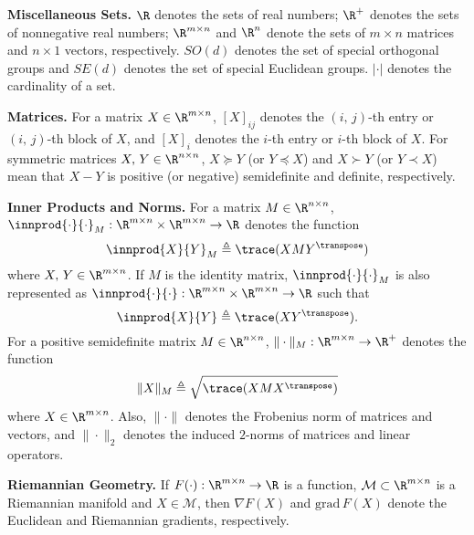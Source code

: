 

\textbf{Miscellaneous Sets.}\; $\R$ denotes the sets of real numbers; $\R^+$ denotes the sets of nonnegative real numbers; $\R^{m\times n}$ and $\R^n$ denote the sets of $m\times n$ matrices and $n\times 1$ vectors, respectively. $SO(d)$ denotes the set of special orthogonal groups and  $SE(d)$ denotes the set of special Euclidean groups.  $|\cdot|$ denotes the cardinality of a set.

\textbf{Matrices.}\; For a matrix $X\in \R^{m\times n}$, $[X]_{ij}$ denotes the $(i,\,j)$-th entry or $(i,\,j)$-th block of $X$, and $[X]_i$ denotes the $i$-th entry or $i$-th block of $X$. For symmetric matrices $X,\, Y\in \R^{n\times n}$, $X\succeq Y$ (or $Y\preceq X$) and $X\succ Y$ (or $Y\prec X$) mean that $X-Y$ is positive (or negative) semidefinite and definite, respectively.

\textbf{Inner Products and Norms.}\; For a matrix $M\in\R^{n\times n}$, $\innprod{\cdot}{\cdot}_{M}:\R^{m\times n}\times \R^{m\times n}\rightarrow \R$ denotes the function
\vspace{-0.25em}
\begin{equation}\label{eq::innerM}
	\innprod{X}{Y}_M\triangleq \trace(XMY^\transpose)
\end{equation}
where $X,\,Y\in \R^{m\times n}$. If $M$ is the identity matrix, $\innprod{\cdot}{\cdot}_M$ is also represented as $\innprod{\cdot}{\cdot}:\R^{m\times n}\times\R^{m\times n}\rightarrow \R$ such that
\vspace{-0.15em}
\begin{equation}\label{eq::inner}
\innprod{X}{Y}\triangleq\trace(XY^\transpose).
\vspace{-0.1em}
\end{equation}
For a positive semidefinite matrix $M\in\R^{n\times n}$, $\|\cdot\|_M:\R^{m\times n}\rightarrow\R^+$ denotes the function
\vspace{-0.15em}
\begin{equation}\label{eq::normM}
\|X\|_M\triangleq\sqrt{\trace(X M X^\transpose)}
\vspace{-0.1em}
\end{equation}
where $X\in \R^{m\times n}$.  Also, $\|\cdot\|$ denotes the Frobenius norm of matrices and vectors, and $\|\cdot\|_2$ denotes the induced $2$-norms of matrices and linear operators.  

\textbf{Riemannian Geometry.}\; If $F(\cdot):\R^{m\times n}\rightarrow\R $ is a function, $\mathcal{M}\subset \R^{m\times n}$ is a Riemannian manifold and $X\in \mathcal{M}$, then {\highlight $\nabla F(X)$ and $\mathrm{grad}\, F(X)$ denote the Euclidean and Riemannian gradients, respectively. }
\vspace{0.15em}

